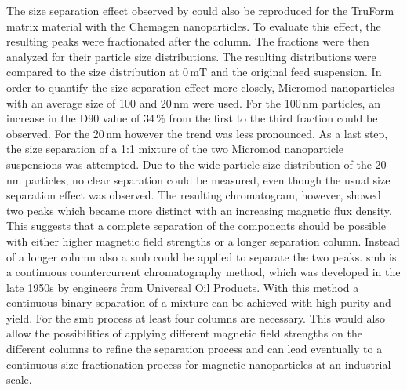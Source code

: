 The size separation effect observed by \cite{AndreMaster} could also be reproduced for the TruForm matrix material with the Chemagen nanoparticles. To evaluate this effect, the resulting peaks were fractionated after the column. The fractions were then analyzed for their particle size distributions. The resulting distributions were compared to the size distribution at 0\,mT and the original feed suspension. In order to quantify the size separation effect more closely, Micromod nanoparticles with an average size of 100 and 20\,nm were used. For the 100\,nm particles, an increase in the D90 value of 34\,\% from the first to the third fraction could be observed. For the 20\,nm however the trend was less pronounced. As a last step, the size separation of a 1:1 mixture of the two Micromod nanoparticle suspensions was attempted. Due to the wide particle size distribution of the 20\,nm particles, no clear separation could be measured, even though the usual size separation effect was observed. The resulting chromatogram, however, showed two peaks which became more distinct with an increasing magnetic flux density. This suggests that a complete separation of the components should be possible with either higher magnetic field strengths or a longer separation column. Instead of a longer column also a \gls{smb} could be applied to separate the two peaks. \Gls{smb} is a continuous countercurrent chromatography method, which was developed in the late 1950s by engineers from Universal Oil Products\cite{broughton1961continuous,carson1962rotary}. With this method a continuous binary separation of a mixture can be achieved with high purity and yield. For the \gls{smb} process at least four columns are necessary. This would also allow the possibilities of applying different magnetic field strengths on the different columns to refine the separation process and can lead eventually to a continuous size fractionation process for magnetic nanoparticles at an industrial scale.  
